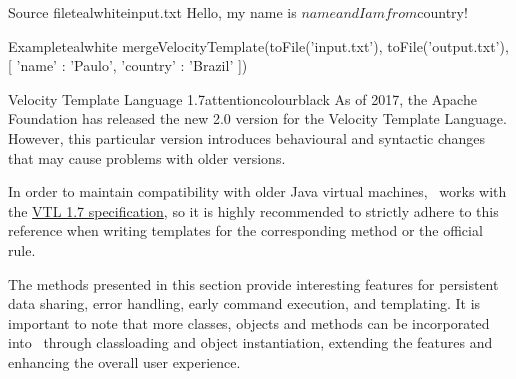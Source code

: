 \begin{description}
\begin{ncodebox}{Source file}{teal}{\icnote}{white}{input.txt}
Hello, my name is ${name} and
I am from ${country}!
\end{ncodebox}

\begin{codebox}{Example}{teal}{\icnote}{white}
mergeVelocityTemplate(toFile('input.txt'), toFile('output.txt'),
     [ 'name' : 'Paulo', 'country' : 'Brazil' ])
\end{codebox}

\begin{messagebox}{Velocity Template Language 1.7}{attentioncolour}{\icattention}{black}
\setlength{\parskip}{1em}
As of 2017, the Apache Foundation has released the new 2.0 version for the Velocity Template Language. However, this particular version introduces behavioural and syntactic changes that may cause problems with older versions.

In order to maintain compatibility with older Java virtual machines, \arara\ works with the \href{http://velocity.apache.org/engine/1.7/vtl-reference.html}{VTL 1.7 specification}, so it is highly recommended to strictly adhere to this reference when writing templates for the corresponding method or the official  rule.
\end{messagebox}
\end{description}

The methods presented in this section provide interesting features for persistent data sharing, error handling, early command execution, and templating. It is important to note that more classes, objects and methods can be incorporated into \arara\ through classloading and object instantiation, extending the features and enhancing the overall user experience.
